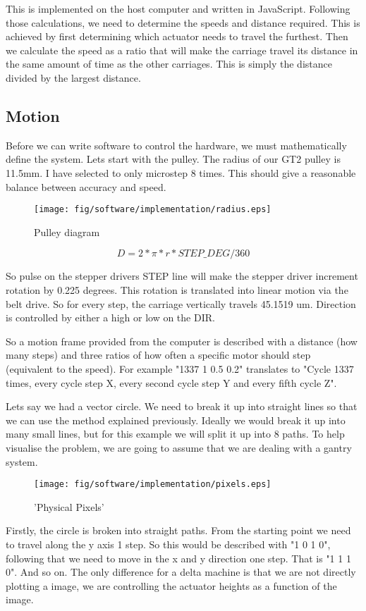 \documentclass[a4paper, 11pt, twoside]{Thesis}  %
\begin{document}
This is implemented on the host computer and written in JavaScript. Following those calculations, we need to determine the speeds and distance required. This is achieved by first determining which actuator needs to travel the furthest. Then we calculate the speed as a ratio that will make the carriage travel its distance in the same amount of time as the other carriages. This is simply the distance divided by the largest distance.

\subsection{Motion}

Before we can write software to control the hardware, we must mathematically define the system. Lets start with the pulley. The radius of our GT2 pulley is 11.5mm. I have selected to only microstep 8 times. This should give a reasonable balance between accuracy and speed.

\begin{figure}[H]
\centering%
\texttt{[image: fig/software/implementation/radius.eps]}
\caption{Pulley diagram}
\label{fig:radius.eps}
\end{figure}
$$ D = 2 * \pi * r * STEP\_DEG/360 $$

So pulse on the stepper drivers STEP line will make the stepper driver increment rotation by 0.225 degrees. This rotation is translated into linear motion via the belt drive. So for every step, the carriage vertically travels 45.1519 um. Direction is controlled by either a high or low on the DIR.

So a motion frame provided from the computer is described with a distance (how many steps) and three ratios of how often a specific motor should step (equivalent to the speed). For example "1337 1 0.5 0.2" translates to "Cycle 1337 times, every cycle step X, every second cycle step Y and every fifth cycle Z".

Lets say we had a vector circle. We need to break it up into straight lines so that we can use the method explained previously. Ideally we would break it up into many small lines, but for this example we will split it up into 8 paths. To help visualise the problem, we are going to assume that we are dealing with a gantry system.


\begin{figure}[H]
\centering%
\texttt{[image: fig/software/implementation/pixels.eps]}
\caption{'Physical Pixels' }
\label{fig:pixels.eps}
\end{figure}
Firstly, the circle is broken into straight paths. From the starting point we need to travel along the y axis 1 step. So this would be described with "1 0 1 0", following that we need to move in the x and y direction one step. That is "1 1 1 0". And so on. The only difference for a delta machine is that we are not directly plotting a image, we are controlling the actuator heights as a function of the image.
\end{document}
